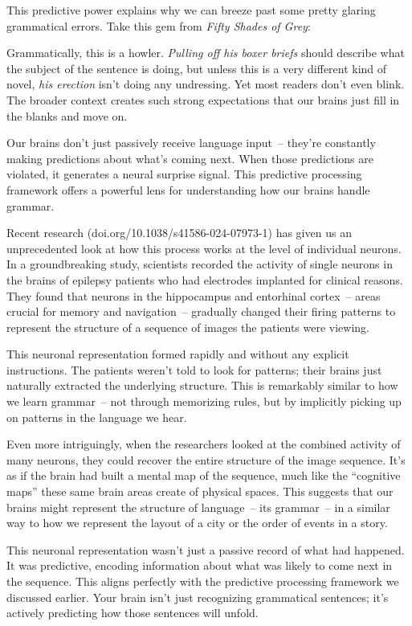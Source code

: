 This predictive power explains why we can breeze past some pretty glaring grammatical errors. Take this gem from \textit{Fifty Shades of Grey}:

\label{ex:erection}
\z

Grammatically, this is a howler. \textit{Pulling off his boxer briefs} should describe what the subject of the sentence is doing, but unless this is a very different kind of novel, \textit{his erection} isn't doing any undressing. Yet most readers don't even blink. The broader context creates such strong expectations that our brains just fill in the blanks and move on.

Our brains don't just passively receive language input~-- they're constantly making predictions about what's coming next. When those predictions are violated, it generates a neural surprise signal. This predictive processing framework offers a powerful lens for understanding how our brains handle grammar.

Recent research (doi.org/10.1038/s41586-024-07973-1) has given us an unprecedented look at how this process works at the level of individual neurons. In a groundbreaking study, scientists recorded the activity of single neurons in the brains of epilepsy patients who had electrodes implanted for clinical reasons. They found that neurons in the hippocampus and entorhinal cortex~-- areas crucial for memory and navigation~-- gradually changed their firing patterns to represent the structure of a sequence of images the patients were viewing.

This neuronal representation formed rapidly and without any explicit instructions. The patients weren't told to look for patterns; their brains just naturally extracted the underlying structure. This is remarkably similar to how we learn grammar~-- not through memorizing rules, but by implicitly picking up on patterns in the language we hear.

Even more intriguingly, when the researchers looked at the combined activity of many neurons, they could recover the entire structure of the image sequence. It's as if the brain had built a mental map of the sequence, much like the ``cognitive maps'' these same brain areas create of physical spaces. This suggests that our brains might represent the structure of language~-- its grammar~-- in a similar way to how we represent the layout of a city or the order of events in a story.

This neuronal representation wasn't just a passive record of what had happened. It was predictive, encoding information about what was likely to come next in the sequence. This aligns perfectly with the predictive processing framework we discussed earlier. Your brain isn't just recognizing grammatical sentences; it's actively predicting how those sentences will unfold.

